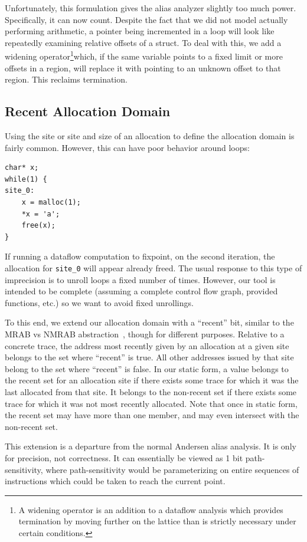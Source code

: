 Unfortunately, this formulation gives the alias analyzer slightly too much power.
Specifically, it can now count.
Despite the fact that we did not model actually performing arithmetic, a pointer being incremented in a loop will look like repeatedly examining relative offsets of a struct.
To deal with this, we add a widening operator\footnote{
	A widening operator is an addition to a dataflow analysis which provides termination by moving further on the lattice than is strictly necessary under certain conditions.
}which, if the same variable points to a fixed limit or more offsets in a region, will replace it with pointing to an unknown offset to that region.
This reclaims termination.

\subsection{Recent Allocation Domain}
\label{sec:effects}
Using the site or site and size of an allocation to define the allocation domain is fairly common.
However, this can have poor behavior around loops:

\begin{lstlisting}
char* x;
while(1) {
site_0:
	x = malloc(1);
	*x = 'a';
	free(x);
}
\end{lstlisting}

If running a dataflow computation to fixpoint, on the second
iteration, the allocation for \texttt{site\_0} will appear already
freed.  The usual response to this type of imprecision is to unroll
loops a fixed number of times.  However, our tool is intended to be
complete (assuming a complete control flow graph, provided functions,
etc.) so we want to avoid fixed unrollings.

To this end, we extend our allocation domain with a ``recent'' bit, similar to the MRAB vs NMRAB abstraction~\cite{vsa}, though for different purposes.
Relative to a concrete trace, the address most recently given by an allocation at a given site belongs to the set where ``recent'' is true.
All other addresses issued by that site belong to the set where ``recent'' is false.
In our static form, a value belongs to the recent set for an allocation site if there exists some trace for which it was the last allocated from that site.
It belongs to the non-recent set if there exists some trace for which it was not most recently allocated.
Note that once in static form, the recent set may have more than one member, and may even intersect with the non-recent set.

This extension is a departure from the normal Andersen alias analysis.
It is only for precision, not correctness.
It can essentially be viewed as 1 bit path-sensitivity, where path-sensitivity would be parameterizing on entire sequences of instructions which could be taken to reach the current point.

